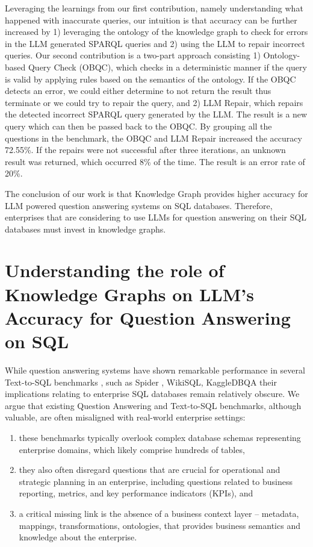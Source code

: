 \documentclass[11pt]{article}
\begin{document}
Leveraging the learnings from our first contribution, namely understanding what happened with inaccurate queries, our intuition is that accuracy can be further increased by 1) leveraging the ontology of the knowledge graph to check for errors in the LLM generated SPARQL queries and 2) using the LLM to repair incorrect queries.
Our second contribution \cite{DBLP:journals/corr/abs-2405-11706,SecondContribution} is a two-part approach consisting 1) Ontology-based Query Check (OBQC), which checks in a deterministic manner if the query is valid by applying rules based on the semantics of the ontology. 
If the OBQC detects an error, we could either determine to not return the result thus terminate or we could try to repair the query, and 2) LLM Repair, which repairs the detected incorrect SPARQL query generated by the LLM. 
The result is a new query which can then be passed back to the OBQC. 
By grouping all the questions in the benchmark, the OBQC and LLM Repair increased the accuracy 72.55\%. If the repairs were not successful after three iterations, an unknown result was returned, which occurred 8\% of the time. The result is an error rate of 20\%. 

The conclusion of our work is that Knowledge Graph provides higher accuracy for LLM powered question answering systems on SQL databases.
Therefore, enterprises that are considering to use LLMs for question answering on their SQL databases must invest in knowledge graphs. 

\section{Understanding the role of Knowledge Graphs on LLM's Accuracy for Question Answering on SQL}

While question answering systems have shown remarkable performance in several Text-to-SQL benchmarks \cite{finegan-dollak-etal-2018-improving,data-sql-advising}, such as Spider \cite{data-spider}, WikiSQL\cite{data-wikisql}, KaggleDBQA\cite{lee-etal-2021-kaggledbqa} their implications relating to enterprise SQL databases remain relatively obscure. 
We argue that existing Question Answering and Text-to-SQL benchmarks, although valuable, are often misaligned with real-world enterprise settings: 
\begin{enumerate}
    \item these benchmarks typically overlook complex database schemas representing enterprise domains, which likely comprise hundreds of tables, 
    \item they also often disregard questions that are crucial for operational and strategic planning in an enterprise, including questions related to business reporting, metrics, and key performance indicators (KPIs), and
    \item a critical missing link is the absence of a business context layer – metadata, mappings, transformations, ontologies, that provides business semantics and knowledge about the enterprise. 
\end{enumerate}
\end{document}
